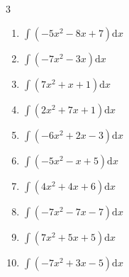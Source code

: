 \begin{multicols}{3}
\begin{enumerate}

\columnbreak %

  \item $\displaystyle \int \left( -5x^{2}-8x+7 \right) \mathrm{d}x$


  \item $\displaystyle \int \left( -7x^{2}-3x \right) \mathrm{d}x$


  \item $\displaystyle \int \left( 7x^{2}+x+1 \right) \mathrm{d}x$


  \item $\displaystyle \int \left( 2x^{2}+7x+1 \right) \mathrm{d}x$


  \item $\displaystyle \int \left( -6x^{2}+2x-3 \right) \mathrm{d}x$


  \item $\displaystyle \int \left( -5x^{2}-x+5 \right) \mathrm{d}x$


  \item $\displaystyle \int \left( 4x^{2}+4x+6 \right) \mathrm{d}x$


  \item $\displaystyle \int \left( -7x^{2}-7x-7 \right) \mathrm{d}x$


  \item $\displaystyle \int \left( 7x^{2}+5x+5 \right) \mathrm{d}x$


  \item $\displaystyle \int \left( -7x^{2}+3x-5 \right) \mathrm{d}x$


\end{enumerate}
\end{multicols}
